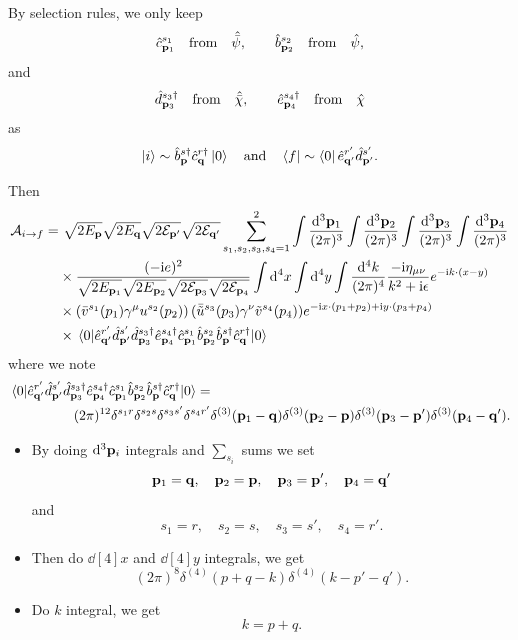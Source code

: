 \documentclass[a4paper,11pt]{article}
\begin{document}
	By selection rules, we only keep 
	\[
		\hat c ^{s_1}_{\vb p_1} \quad \text{from} \quad \hat{\bar \psi}, \qquad \hat b ^{s_2}_{\vb p_2} \quad \text{from} \quad \hat \psi,
	\]
	and
	\[
		\hat d ^{s_3\dagger}_{\vb p_3} \quad \text{from} \quad \hat{\bar \chi}, \qquad \hat e ^{s_4\dagger}_{\vb p_4} \quad \text{from} \quad \hat \chi
	\]
	as 
	\[
		\ket{i} \sim \hat b^{s\dagger}_{\vb p} \hat c^{r\dagger}_{\vb q} \ket{0} \quad \text{and} \quad \bra{f} \sim \bra{0} \hat e ^{r'}_{\vb q'} \hat d ^{s'}_{\vb p'}.
	\]
	
	Then 
	\begin{align*}
		\mathcal{A}_{i \to f} = &\ \sqrt{2 E _{\vb p}} \sqrt{2 E _{\vb q}} \sqrt{2 \mathcal{E}_{\vb p'}} \sqrt{2 \mathcal{E}_{\vb q'}} \sum _{s_1,s_2,s_3,s_4 = 1}^2 \int \frac{\dd[3]{\vb p_1}}{(2\pi)^{3}} \int \frac{\dd[3]{\vb p_2}}{(2\pi)^{3}} \int \frac{\dd[3]{\vb p_3}}{(2\pi)^{3}} \int \frac{\dd[3]{\vb p_4}}{(2\pi)^{3}}\\
		& \times \frac{(-\mathrm{i} e)^2}{\sqrt{2 E _{\vb p_1}} \sqrt{2 E _{\vb p_2}} \sqrt{2 \mathcal{E}_{\vb p_3}} \sqrt{2 \mathcal{E}_{\vb p_4}}} \int \dd[4]{x}\int \dd[4]{y} \int \frac{\dd[4]{k}}{(2\pi)^{4}} \frac{-\mathrm{i} \eta _{\mu \nu}}{k^2 + \mathrm{i} \epsilon} e ^{- \mathrm{i} k \cdot (x - y)}\\
		& \times \left( \bar v ^{s_1}(p_1) \gamma^\mu u ^{s_2}(p_2) \right) (\bar{\tilde u} ^{s_3}(p_3) \gamma^\nu \tilde v ^{s_4}(p_4)) e ^{- \mathrm{i} x \cdot (p_1 + p_2) + \mathrm{i} y \cdot (p_3 + p_4)}\\
		& \times \mel{0}{\hat e ^{r'}_{\vb q'} \hat d ^{s'}_{\vb p'} \hat d^{s_3\dagger}_{\vb p_3}\hat e ^{s_4\dagger}_{\vb p_4} \hat c ^{s_1}_{\vb p_1}\hat b ^{s_2}_{\vb p_2} \hat b ^{s\dagger}_{\vb p} \hat c ^{r\dagger}_{\vb q}}{0}
	\end{align*}
	where we note
	\begin{align*}
		\mel{0}{\hat e ^{r'}_{\vb q'} \hat d ^{s'}_{\vb p'} \hat d^{s_3\dagger}_{\vb p_3}\hat e ^{s_4\dagger}_{\vb p_4} \hat c ^{s_1}_{\vb p_1}\hat b ^{s_2}_{\vb p_2} \hat b ^{s\dagger}_{\vb p} \hat c ^{r\dagger}_{\vb q}}{0} = &\\
		(2 \pi)^{12} \delta ^{s_1 r} \delta ^{s_2 s} \delta ^{s_3 s'} \delta ^{s_4 r'} &\delta ^{(3)}(\vb p_1 - \vb q) \delta ^{(3)}(\vb p_2 - \vb p) \delta ^{(3)}(\vb p_3 - \vb p') \delta ^{(3)} (\vb p_4 - \vb q').
	\end{align*}
	\begin{itemize}
		\item By doing $\dd[3]{\vb p_i}$ integrals and $\sum _{s_i}$ sums we set  \[
			\vb p_1 = \vb q, \quad \vb p_2 = \vb p, \quad \vb p_3 = \vb p', \quad \vb p_4 = \vb q' 
		\]
		and \[
			s_1 = r, \quad s_2 = s, \quad s_3 = s', \quad s_4 = r'.
		\]
		\item Then do $\dd[4]{x}$ and $\dd[4]{y}$ integrals, we get \[
			(2 \pi)^8 \delta ^{(4)}(p + q - k) \delta ^{(4)} (k - p' - q').
		\]
		\item Do $k$ integral, we get \[
			k = p + q.
		\]
	\end{itemize}
\end{document}
